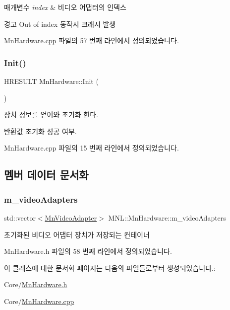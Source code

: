 \begin{DoxyParams}{매개변수}
{\em index} & 비디오 어댑터의 인덱스 \\
\hline
\end{DoxyParams}
\begin{DoxyWarning}{경고}
Out of index 동작시 크래시 발생 
\end{DoxyWarning}


Mn\+Hardware.\+cpp 파일의 57 번째 라인에서 정의되었습니다.

\mbox{\label{class_m_n_l_1_1_mn_hardware_a440da8664ff9470a3f5ef7f349a6d7f4}} 
\subsubsection{\texorpdfstring{Init()}{Init()}}
{\footnotesize\ttfamily H\+R\+E\+S\+U\+LT Mn\+Hardware\+::\+Init (\begin{DoxyParamCaption}{ }\end{DoxyParamCaption})}



장치 정보를 얻어와 초기화 한다. 

\begin{DoxyReturn}{반환값}
초기화 성공 여부. 
\end{DoxyReturn}


Mn\+Hardware.\+cpp 파일의 15 번째 라인에서 정의되었습니다.



\subsection{멤버 데이터 문서화}
\mbox{\label{class_m_n_l_1_1_mn_hardware_a34ada79c31e979efd31bc7cee9c6e6e1}} 
\subsubsection{\texorpdfstring{m\+\_\+video\+Adapters}{m\_videoAdapters}}
{\footnotesize\ttfamily std\+::vector$<$\hyperlink{class_m_n_l_1_1_mn_video_adapter}{Mn\+Video\+Adapter}$>$ M\+N\+L\+::\+Mn\+Hardware\+::m\+\_\+video\+Adapters\hspace{0.3cm}{\ttfamily [private]}}



초기화된 비디오 어댑터 장치가 저장되는 컨테이너 



Mn\+Hardware.\+h 파일의 58 번째 라인에서 정의되었습니다.



이 클래스에 대한 문서화 페이지는 다음의 파일들로부터 생성되었습니다.\+:\begin{DoxyCompactItemize}
\item 
Core/\hyperlink{_mn_hardware_8h}{Mn\+Hardware.\+h}\item 
Core/\hyperlink{_mn_hardware_8cpp}{Mn\+Hardware.\+cpp}\end{DoxyCompactItemize}
